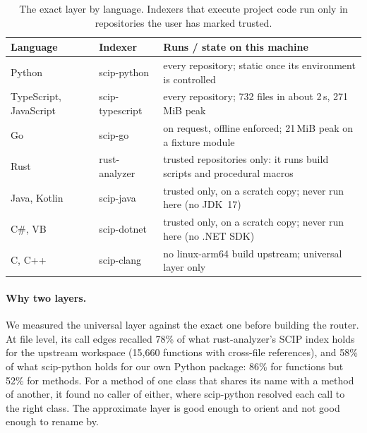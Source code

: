 \documentclass[11pt]{article}
\begin{document}
\begin{table}[t]
\centering
\small
\begin{tabularx}{\linewidth}{@{}l l X@{}}
\toprule
Language & Indexer & Runs / state on this machine \\
\midrule
Python & scip-python & every repository; static once its environment is controlled \\
TypeScript, JavaScript & scip-typescript & every repository; 732 files in about 2\,s, 271\,MiB peak \\
Go & scip-go & on request, offline enforced; 21\,MiB peak on a fixture module \\
Rust & rust-analyzer & trusted repositories only: it runs build scripts and procedural macros \\
Java, Kotlin & scip-java & trusted only, on a scratch copy; never run here (no JDK~17) \\
C\#, VB & scip-dotnet & trusted only, on a scratch copy; never run here (no .NET SDK) \\
C, C++ & scip-clang & no linux-arm64 build upstream; universal layer only \\
\bottomrule
\end{tabularx}
\caption{The exact layer by language. Indexers that execute project code run only in repositories
the user has marked trusted.}
\label{tab:indexers}
\end{table}

\paragraph{Why two layers.} We measured the universal layer against the exact one before building
the router. At file level, its call edges recalled 78\% of what rust-analyzer's SCIP index holds
for the upstream workspace (15{,}660 functions with cross-file references), and 58\% of what
scip-python holds for our own Python package: 86\% for functions but 52\% for methods. For a
method of one class that shares its name with a method of another, it found no caller of either,
where scip-python resolved each call to the right class. The approximate layer is good enough to
orient and not good enough to rename by.
\end{document}

